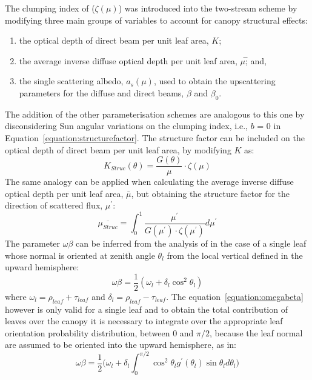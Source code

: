The clumping index of \citet{pinty2006} ($\zeta(\mu)$) was introduced into the two-stream scheme by modifying three main groups of variables to account for canopy structural effects: 
\begin{enumerate}
\item the optical depth of direct beam per unit leaf area, $K$; 
\item the average inverse diffuse optical depth per unit leaf area, $\mu$̅; and, 
\item the single scattering albedo, $a_s(\mu)$, used to obtain the upscattering parameters for the diffuse and direct beams, $\beta$ and $\beta_0$.
\end{enumerate}
The addition of the other parameterisation schemes are analogous to this one by disconsidering Sun angular variations on the clumping index, i.e., $b$ = 0 in Equation~\ref{equation:structurefactor}. The structure factor can be included on the optical depth of direct beam per unit leaf area, by modifying $K$ as:
\begin{equation}
K_{Struc}(\theta) = \frac{G(\theta)}{\mu} \cdot  \zeta(\mu)
\label{equation:opticaldepthstruct}
\end{equation}
The same analogy can be applied when calculating the average inverse diffuse optical depth per unit leaf area, $\bar{\mu}$, but obtaining the structure factor for the direction of scattered flux, $\mu^\prime$:
\begin{equation}
\overline{\mu_{Struc}} = \int_{0}^{1} \frac{\mu^\prime}{G(\mu^\prime) \cdot \zeta(\mu^\prime)} d\mu^\prime
\label{equation:muprimestruct}
\end{equation}
The parameter $\omega\beta$ can be inferred from the analysis of \citet{Norman1975} in the case of a single leaf whose normal is oriented at zenith angle $\theta_l$ from the local vertical defined in the upward hemisphere:
\begin{equation}
\omega\beta = \frac{1}{2}(\omega_l + \delta_l \cos^2 \theta_l)
\label{equation:omegabeta}
\end{equation}
\noindent where $\omega_l = \rho_{leaf} + \tau_{leaf}$ and $\delta_l = \rho_{leaf} - \tau_{leaf}$. 
The equation~\ref{equation:omegabeta} however is only valid for a single leaf and to obtain the total contribution of leaves over the canopy it is necessary to integrate over the appropriate leaf orientation probability distribution, between 0 and $\pi/2$, because the leaf normal are assumed to be oriented into the upward hemisphere, as in:
\begin{equation}
\omega\beta = \frac{1}{2}\Big(\omega_l + \delta_l \int_{0}^{\pi/2} \cos^2 \theta_l g^\prime(\theta_l) \sin \theta_l d\theta_l\Big)
\label{equation:omegabeta2}
\end{equation}
